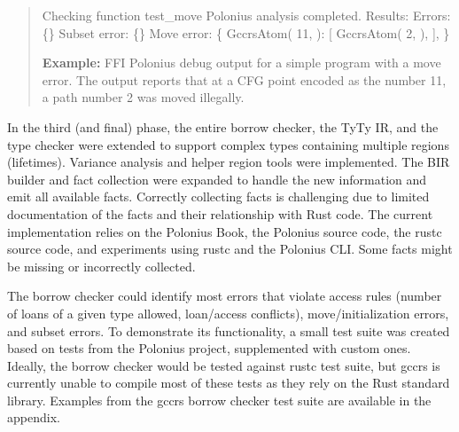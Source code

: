 \documentclass[
  11pt,
  twoside,symmetric]{report}
\newenvironment{Shaded}{}{}
\newcommand{\DecValTok}[1]{#1}
\newcommand{\NormalTok}[1]{#1}
\newcommand{\OperatorTok}[1]{#1}
\begin{document}
\begin{quote}
\begin{Shaded}
\begin{Highlighting}[]
\NormalTok{[}\DecValTok{34}\OperatorTok{/}\DecValTok{35}\NormalTok{] Checking function test\_move}
\NormalTok{Polonius analysis completed}\OperatorTok{.}\NormalTok{ Results}\OperatorTok{:}
\NormalTok{Errors}\OperatorTok{:} \OperatorTok{\{\}}
\NormalTok{Subset error}\OperatorTok{:} \OperatorTok{\{\}}
\NormalTok{Move error}\OperatorTok{:} \OperatorTok{\{}
\NormalTok{   GccrsAtom(}
       \DecValTok{11}\OperatorTok{,}
\NormalTok{   )}\OperatorTok{:}\NormalTok{ [}
\NormalTok{       GccrsAtom(}
           \DecValTok{2}\OperatorTok{,}
\NormalTok{       )}\OperatorTok{,}
\NormalTok{   ]}\OperatorTok{,}
\OperatorTok{\}}
\end{Highlighting}
\end{Shaded}

\textbf{Example:} FFI Polonius debug output for a simple program with a
move error. The output reports that at a CFG point encoded as the number
11, a path number 2 was moved illegally.
\end{quote}

In the third (and final) phase, the entire borrow checker, the TyTy IR,
and the type checker were extended to support complex types containing
multiple regions (lifetimes). Variance analysis and helper region tools
were implemented. The BIR builder and fact collection were expanded to
handle the new information and emit all available facts. Correctly
collecting facts is challenging due to limited documentation of the
facts and their relationship with Rust code. The current implementation
relies on the Polonius Book, the
Polonius source code, the rustc
source code, and experiments using
rustc and the Polonius CLI. Some facts might be missing or incorrectly
collected.

The borrow checker could identify most errors that violate access rules
(number of loans of a given type allowed, loan/access conflicts),
move/initialization errors, and subset errors. To demonstrate its
functionality, a small test suite was created based on tests from the
Polonius project, supplemented with custom ones. Ideally, the borrow
checker would be tested against rustc test suite, but gccrs is currently
unable to compile most of these tests as they rely on the Rust standard
library. Examples from the gccrs borrow checker test suite are available
in the appendix.
\end{document}
